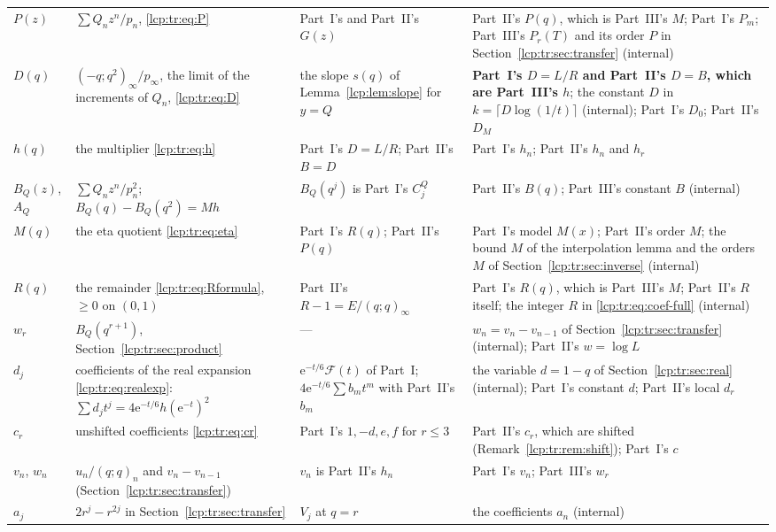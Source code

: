 \documentclass[11pt]{article}
\numberwithin{equation}{section}
\theoremstyle{definition}\newtheorem{definition}[theorem]{Definition}
\theoremstyle{remark}\newtheorem{remark}[theorem]{Remark}
\newcommand{\ee}{\mathrm e}
\begin{document}
{\begin{longtable}{@{}>{\raggedright}p{}>{\raggedright}p{}>{\raggedright}p{}>{\raggedright\arraybackslash}p{}@{}}
$P(z)$ & $\sum Q_nz^n/p_n$, \eqref{lcp:tr:eq:P} & Part~I's and Part~II's $G(z)$ & Part~II's $P(q)$, which is Part~III's $M$; Part~I's $P_m$; Part~III's $P_r(T)$ and its order $P$ in Section~\ref{lcp:tr:sec:transfer} (internal)\\
$D(q)$ & $(-q;q^2)_\infty/p_\infty$, the limit of the increments of $Q_n$, \eqref{lcp:tr:eq:D} & the slope $s(q)$ of Lemma~\ref{lcp:lem:slope} for $y=Q$ & \textbf{Part~I's $D=L/R$ and Part~II's $D=B$, which are Part~III's $h$}; the constant $D$ in $k=\lceil D\log(1/t)\rceil$ (internal); Part~I's $D_0$; Part~II's $D_M$\\
$h(q)$ & the multiplier \eqref{lcp:tr:eq:h} & Part~I's $D=L/R$; Part~II's $B=D$ & Part~I's $h_n$; Part~II's $h_n$ and $h_r$\\
$B_Q(z)$, $A_Q$ & $\sum Q_nz^n/p_n^2$; $B_Q(q)-B_Q(q^2)=Mh$ & $B_Q(q^j)$ is Part~I's $C^Q_j$ & Part~II's $B(q)$; Part~III's constant $B$ (internal)\\
$M(q)$ & the eta quotient \eqref{lcp:tr:eq:eta} & Part~I's $R(q)$; Part~II's $P(q)$ & Part~I's model $M(x)$; Part~II's order $M$; the bound $M$ of the interpolation lemma and the orders $M$ of Section~\ref{lcp:tr:sec:inverse} (internal)\\
$R(q)$ & the remainder \eqref{lcp:tr:eq:Rformula}, $\ge0$ on $(0,1)$ & Part~II's $R-1=E/(q;q)_\infty$ & Part~I's $R(q)$, which is Part~III's $M$; Part~II's $R$ itself; the integer $R$ in \eqref{lcp:tr:eq:coef-full} (internal)\\
$w_r$ & $B_Q(q^{r+1})$, Section~\ref{lcp:tr:sec:product} & --- & $w_n=v_n-v_{n-1}$ of Section~\ref{lcp:tr:sec:transfer} (internal); Part~II's $w=\log L$\\
$d_j$ & coefficients of the real expansion \eqref{lcp:tr:eq:realexp}: $\sum d_jt^j=4\ee^{-t/6}h(\ee^{-t})^2$ & $\ee^{-t/6}\mathcal F(t)$ of Part~I; $4\ee^{-t/6}\sum b_mt^m$ with Part~II's $b_m$ & the variable $d=1-q$ of Section~\ref{lcp:tr:sec:real} (internal); Part~I's constant $d$; Part~II's local $d_r$\\
$c_r$ & unshifted coefficients \eqref{lcp:tr:eq:cr} & Part~I's $1,-d,e,f$ for $r\le3$ & Part~II's $c_r$, which are shifted (Remark~\ref{lcp:tr:rem:shift}); Part~I's $c$\\
$v_n$, $w_n$ & $u_n/(q;q)_n$ and $v_n-v_{n-1}$ (Section~\ref{lcp:tr:sec:transfer}) & $v_n$ is Part~II's $h_n$ & Part~I's $v_n$; Part~III's $w_r$\\
$a_j$ & $2r^j-r^{2j}$ in Section~\ref{lcp:tr:sec:transfer} & $V_j$ at $q=r$ & the coefficients $a_n$ (internal)\\

\end{longtable}}
\end{document}
